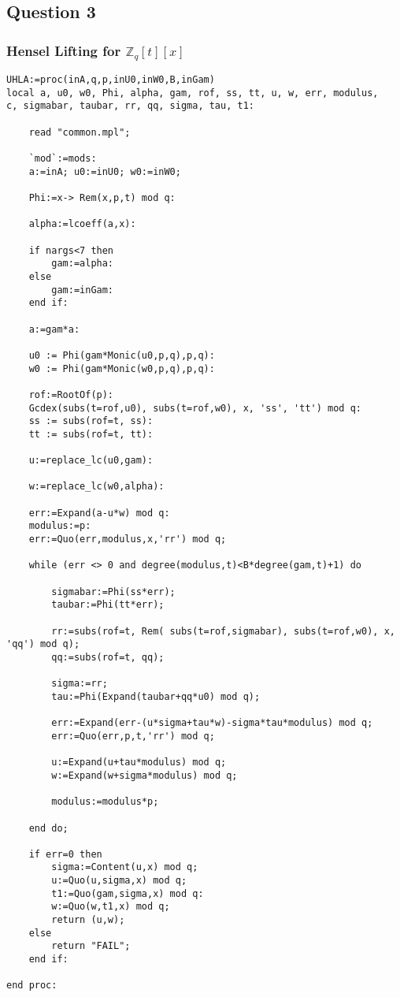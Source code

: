 \documentclass[10pt]{report}
\theoremstyle{plain}
\theoremstyle{definition}
\begin{document}
\clearpage
\subsection*{Question 3}
\subsubsection*{Hensel Lifting for $\mathbb{Z}_q[t][x]$}


\begin{verbatim}
UHLA:=proc(inA,q,p,inU0,inW0,B,inGam)
local a, u0, w0, Phi, alpha, gam, rof, ss, tt, u, w, err, modulus, 
c, sigmabar, taubar, rr, qq, sigma, tau, t1:
    
    read "common.mpl";
    
    `mod`:=mods:
    a:=inA; u0:=inU0; w0:=inW0;
    
    Phi:=x-> Rem(x,p,t) mod q:
    
    alpha:=lcoeff(a,x):
    
    if nargs<7 then
        gam:=alpha:
    else
        gam:=inGam:
    end if:
    
    a:=gam*a:
    
    u0 := Phi(gam*Monic(u0,p,q),p,q):
    w0 := Phi(gam*Monic(w0,p,q),p,q):
    
    rof:=RootOf(p):
    Gcdex(subs(t=rof,u0), subs(t=rof,w0), x, 'ss', 'tt') mod q:
    ss := subs(rof=t, ss):
    tt := subs(rof=t, tt):
    
    u:=replace_lc(u0,gam):
    
    w:=replace_lc(w0,alpha):
    
    err:=Expand(a-u*w) mod q:
    modulus:=p:
    err:=Quo(err,modulus,x,'rr') mod q;
    
    while (err <> 0 and degree(modulus,t)<B*degree(gam,t)+1) do
        
        sigmabar:=Phi(ss*err);
        taubar:=Phi(tt*err);
        
        rr:=subs(rof=t, Rem( subs(t=rof,sigmabar), subs(t=rof,w0), x, 'qq') mod q);
        qq:=subs(rof=t, qq);
        
        sigma:=rr;
        tau:=Phi(Expand(taubar+qq*u0) mod q);
        
        err:=Expand(err-(u*sigma+tau*w)-sigma*tau*modulus) mod q;
        err:=Quo(err,p,t,'rr') mod q;
        
        u:=Expand(u+tau*modulus) mod q;
        w:=Expand(w+sigma*modulus) mod q;
        
        modulus:=modulus*p;
        
    end do;
    
    if err=0 then
        sigma:=Content(u,x) mod q;
        u:=Quo(u,sigma,x) mod q;
        t1:=Quo(gam,sigma,x) mod q:
        w:=Quo(w,t1,x) mod q;
        return (u,w);
    else
        return "FAIL";
    end if:
    
end proc:
\end{verbatim}
\end{document}
